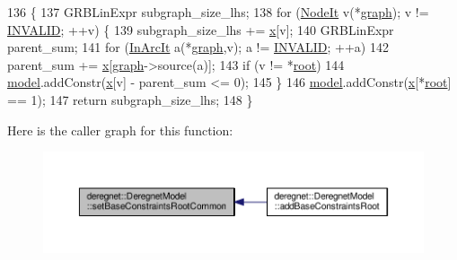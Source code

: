 \begin{DoxyCode}
136                                                                     \{
137     GRBLinExpr subgraph\_size\_lhs;
138     \textcolor{keywordflow}{for} (\hyperlink{namespacederegnet_ac34314e1b5f456fc6d1bb9d96316de4a}{NodeIt} v(*\hyperlink{classderegnet_1_1DeregnetModel_a3cd2f54b8e061ef5bed32708d9bc1ef1}{graph}); v != \hyperlink{usinglemon_8h_adf770fe2eec438e3758ffe905dbae208}{INVALID}; ++v) \{
139         subgraph\_size\_lhs += \hyperlink{classderegnet_1_1DeregnetModel_a360c980f3fec4dfbab50e9bb06a933a8}{x}[v];
140         GRBLinExpr parent\_sum;
141         \textcolor{keywordflow}{for} (\hyperlink{namespacederegnet_aed58be361aeda4ef7a9eaca2731ba830}{InArcIt} a(*\hyperlink{classderegnet_1_1DeregnetModel_a3cd2f54b8e061ef5bed32708d9bc1ef1}{graph},v); a != \hyperlink{usinglemon_8h_adf770fe2eec438e3758ffe905dbae208}{INVALID}; ++a)
142             parent\_sum += \hyperlink{classderegnet_1_1DeregnetModel_a360c980f3fec4dfbab50e9bb06a933a8}{x}[\hyperlink{classderegnet_1_1DeregnetModel_a3cd2f54b8e061ef5bed32708d9bc1ef1}{graph}->source(a)];
143         \textcolor{keywordflow}{if} (v != *\hyperlink{classderegnet_1_1DeregnetModel_a54b20393a0e26d65935d387685d7fe96}{root})
144             \hyperlink{classderegnet_1_1DeregnetModel_a30d525de2086e342b33fe3e45ede4947}{model}.addConstr(\hyperlink{classderegnet_1_1DeregnetModel_a360c980f3fec4dfbab50e9bb06a933a8}{x}[v] - parent\_sum <= 0);
145     \}
146     \hyperlink{classderegnet_1_1DeregnetModel_a30d525de2086e342b33fe3e45ede4947}{model}.addConstr(\hyperlink{classderegnet_1_1DeregnetModel_a360c980f3fec4dfbab50e9bb06a933a8}{x}[*\hyperlink{classderegnet_1_1DeregnetModel_a54b20393a0e26d65935d387685d7fe96}{root}] == 1);
147     \textcolor{keywordflow}{return} subgraph\_size\_lhs;
148 \}
\end{DoxyCode}


Here is the caller graph for this function\+:\nopagebreak
\begin{figure}[H]
\begin{center}
\leavevmode
\includegraphics[width=350pt]{classderegnet_1_1DeregnetModel_ab6093e7558a653c17145e8e08a96938f_icgraph}
\end{center}
\end{figure}


